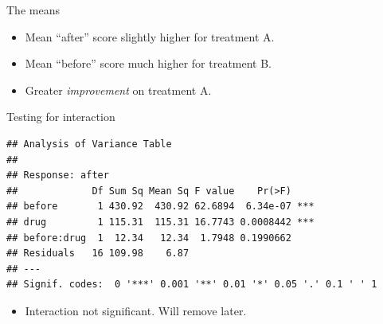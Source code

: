 \begin{frame}[fragile]{The means}

 
\begin{knitrout}
\color{fgcolor}
\end{knitrout}
  

\begin{itemize}
\item Mean ``after'' score slightly higher for treatment A.
\item Mean ``before'' score much higher for treatment B.
\item Greater {\em improvement} on treatment A. 
\end{itemize}
  
\end{frame}

\begin{frame}[fragile]{Testing for interaction}

 
\begin{knitrout}
\color{fgcolor}\begin{kframe}
\begin{alltt}
\hlkwb{=}\hlopt{~}\hlopt{*}
\end{alltt}
\begin{verbatim}
## Analysis of Variance Table
## 
## Response: after
##             Df Sum Sq Mean Sq F value    Pr(>F)    
## before       1 430.92  430.92 62.6894  6.34e-07 ***
## drug         1 115.31  115.31 16.7743 0.0008442 ***
## before:drug  1  12.34   12.34  1.7948 0.1990662    
## Residuals   16 109.98    6.87                      
## ---
## Signif. codes:  0 '***' 0.001 '**' 0.01 '*' 0.05 '.' 0.1 ' ' 1
\end{verbatim}
\end{kframe}
\end{knitrout}


\begin{itemize}
\item Interaction not significant. Will remove later.
\end{itemize}
\end{frame}



